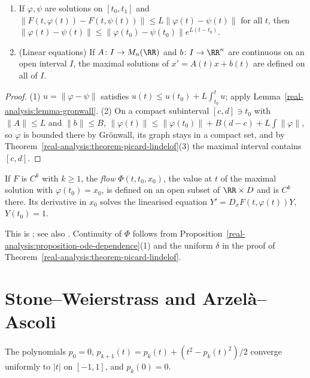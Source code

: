 \begin{proposition}\label{real-analysis:proposition-ode-dependence}
\begin{enumerate}
\item If $\varphi, \psi$ are solutions on $[t_0, t_1]$ and $\|F(t, \varphi(t)) - F(t, \psi(t))\| \leq L\|\varphi(t) - \psi(t)\|$ for all $t$, then
$\|\varphi(t) - \psi(t)\| \leq \|\varphi(t_0) - \psi(t_0)\|e^{L(t - t_0)}$.
\item (Linear equations) If $A \colon I \to M_n(\RR)$ and $b \colon I \to \RR^n$ are continuous on an open interval $I$, the maximal solutions of $x' = A(t)x + b(t)$ are defined on all of $I$.
\end{enumerate}
\end{proposition}

\begin{proof}
(1) $u = \|\varphi - \psi\|$ satisfies $u(t) \leq u(t_0) + L\int_{t_0}^tu$; apply Lemma~\ref{real-analysis:lemma-gronwall}. (2) On a compact subinterval $[c, d] \ni t_0$ with $\|A\| \leq L$ and $\|b\| \leq B$,
$\|\varphi(t)\| \leq \|\varphi(t_0)\| + B(d - c) + L\int\|\varphi\|$, so $\varphi$ is bounded there by Gr\"onwall, its graph stays in a compact set, and by Theorem~\ref{real-analysis:theorem-picard-lindelof}(3)
the maximal interval contains $[c, d]$.
\end{proof}

\begin{theorem}\label{real-analysis:theorem-smooth-dependence}
If $F$ is $C^k$ with $k \geq 1$, the \emph{flow} $\Phi(t, t_0, x_0)$, the value at $t$ of the maximal solution with $\varphi(t_0) = x_0$, is defined on an open subset of $\RR \times D$ and is $C^k$
there. Its derivative in $x_0$ solves the linearised equation $Y' = D_xF(t, \varphi(t))Y$, $Y(t_0) = 1$.
\end{theorem}

This is \cite[Chapter V]{hartman-ode}; see also \cite{lang-real-functional}. Continuity of $\Phi$ follows from Proposition~\ref{real-analysis:proposition-ode-dependence}(1) and the uniform $\delta$ in
the proof of Theorem~\ref{real-analysis:theorem-picard-lindelof}.

\section{Stone--Weierstrass and Arzel\`a--Ascoli}\label{real-analysis:section-approximation}

\begin{lemma}\label{real-analysis:lemma-absolute-value-polynomials}
The polynomials $p_0 = 0$, $p_{k+1}(t) = p_k(t) + (t^2 - p_k(t)^2)/2$ converge uniformly to $|t|$ on $[-1, 1]$, and $p_k(0) = 0$.
\end{lemma}

